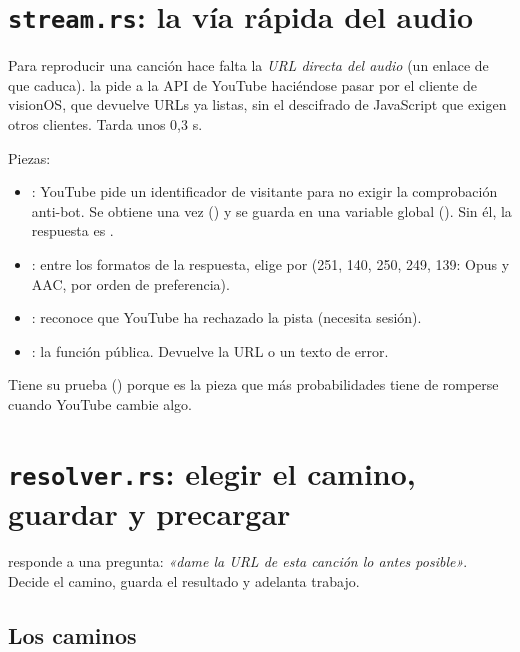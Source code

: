 \section{\texttt{stream.rs}: la vía rápida del audio}

Para reproducir una canción hace falta la \emph{URL directa del audio} (un enlace de
 que caduca).  la pide a la API  de
YouTube haciéndose pasar por el cliente de visionOS, que devuelve URLs ya listas, sin el
descifrado de JavaScript que exigen otros clientes. Tarda unos 0,3 s.

Piezas:

\begin{itemize}
  \item {}: YouTube pide un identificador de visitante para no exigir la
  comprobación anti-bot. Se obtiene una vez () y se guarda en una variable
  global (). Sin él, la respuesta es
  .
  \item {}: entre los formatos de la respuesta, elige por
   (251, 140, 250, 249, 139: Opus y AAC, por orden de preferencia).
  \item {}: reconoce que YouTube ha rechazado la pista (necesita sesión).
  \item {}: la función pública. Devuelve la URL o un texto de error.
\end{itemize}

Tiene su prueba () porque es la pieza que más
probabilidades tiene de romperse cuando YouTube cambie algo.

\section{\texttt{resolver.rs}: elegir el camino, guardar y precargar}

 responde a una pregunta: \emph{«dame la URL de esta canción lo antes
posible»}. Decide el camino, guarda el resultado y adelanta trabajo.

\subsection{Los caminos}

